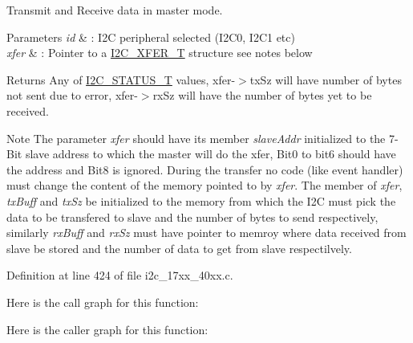 Transmit and Receive data in master mode. 


\begin{DoxyParams}{Parameters}
{\em id} & \+: I2C peripheral selected (I2\+C0, I2\+C1 etc) \\
\hline
{\em xfer} & \+: Pointer to a \hyperlink{structI2C__XFER__T}{I2\+C\+\_\+\+X\+F\+E\+R\+\_\+T} structure see notes below \\
\hline
\end{DoxyParams}
\begin{DoxyReturn}{Returns}
Any of \hyperlink{group__I2C__17XX__40XX_ga21aa839302786105dcf6a96be0e6e8bc}{I2\+C\+\_\+\+S\+T\+A\+T\+U\+S\+\_\+T} values, xfer-\/$>$tx\+Sz will have number of bytes not sent due to error, xfer-\/$>$rx\+Sz will have the number of bytes yet to be received. 
\end{DoxyReturn}
\begin{DoxyNote}{Note}
The parameter {\itshape xfer} should have its member {\itshape slave\+Addr} initialized to the 7-\/\+Bit slave address to which the master will do the xfer, Bit0 to bit6 should have the address and Bit8 is ignored. During the transfer no code (like event handler) must change the content of the memory pointed to by {\itshape xfer}. The member of {\itshape xfer}, {\itshape tx\+Buff} and {\itshape tx\+Sz} be initialized to the memory from which the I2C must pick the data to be transfered to slave and the number of bytes to send respectively, similarly {\itshape rx\+Buff} and {\itshape rx\+Sz} must have pointer to memroy where data received from slave be stored and the number of data to get from slave respectilvely. 
\end{DoxyNote}


Definition at line 424 of file i2c\+\_\+17xx\+\_\+40xx.\+c.



Here is the call graph for this function\+:




Here is the caller graph for this function\+:


